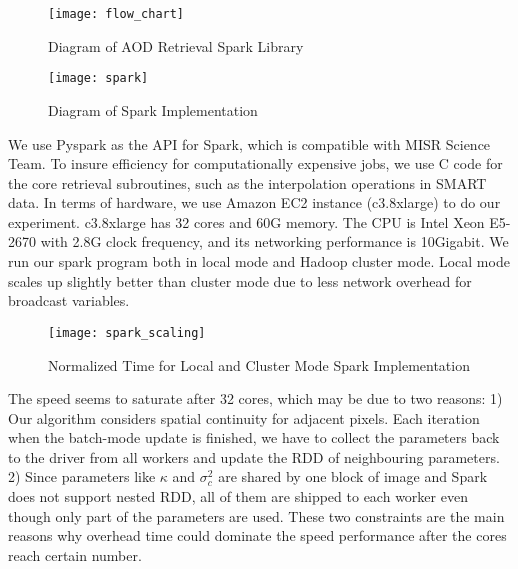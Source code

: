 \begin{figure}[h!]
    \centering
    \texttt{[image: flow\_chart]}
    \caption{Diagram of AOD Retrieval Spark Library}
    \label{fig:flow_chart}
\end{figure}

\begin{figure}[h!]
    \centering
    \texttt{[image: spark]}
    \caption{Diagram of Spark Implementation}
    \label{fig:spark}
\end{figure}

We use Pyspark as the API for Spark, which is compatible with MISR Science Team. To insure efficiency for computationally expensive jobs, we use C code for the core retrieval subroutines, such as the interpolation operations in SMART data. In terms of hardware, we use Amazon EC2 instance (c3.8xlarge) to do our experiment. c3.8xlarge has 32 cores and 60G memory. The CPU is Intel Xeon E5-2670 with 2.8G clock frequency, and its networking performance is 10Gigabit. We run our spark program both in local mode and Hadoop cluster mode. Local mode scales up slightly better than cluster mode due to less network overhead for broadcast variables.

\begin{figure}[h!]
    \centering
    \texttt{[image: spark\_scaling]}
    \caption{Normalized Time for Local and Cluster Mode Spark Implementation}
    \label{fig:spark_scaling}
\end{figure}

The speed seems to saturate after 32 cores, which may be due to two reasons: 1) Our algorithm considers spatial continuity for adjacent pixels. Each iteration when the batch-mode update is finished, we have to collect the parameters back to the driver from all workers and update the RDD of neighbouring parameters. 2) Since parameters like $\kappa$ and $\sigma^2_c$ are shared by one block of image and Spark does not support nested RDD, all of them are shipped to each worker even though only part of the parameters are used. These two constraints are the main reasons why overhead time could dominate the speed performance after the cores reach certain number.
